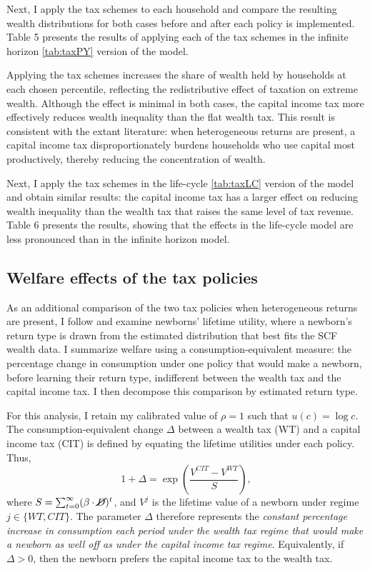 \par Next, I apply the tax schemes to each household and compare the resulting wealth distributions for both cases before and after each policy is implemented. Table 5 presents the results of applying each of the tax schemes in the infinite horizon \ref{tab:taxPY} version of the model. 
\unskip

\par Applying the tax schemes increases the share of wealth held by households at each chosen percentile, reflecting the redistributive effect of taxation on extreme wealth. Although the effect is minimal in both cases, the capital income tax more effectively reduces wealth inequality than the flat wealth tax. This result is consistent with the extant literature:  when heterogeneous returns are present, a capital income tax disproportionately burdens households who use capital most productively, thereby reducing the concentration of wealth. 

\par Next, I apply the tax schemes in the life-cycle \ref{tab:taxLC} version of the model and obtain similar results: the capital income tax has a larger effect on reducing wealth inequality than the wealth tax that raises the same level of tax revenue. Table 6 presents the results, showing that the effects in the life-cycle model are less pronounced than in the infinite horizon model. 

\unskip

\subsection{Welfare effects of the tax policies}

\par As an additional comparison of the two tax policies when heterogeneous returns are present, I follow \cite{Guvenen2023} and examine newborns' lifetime utility, where a newborn's return type is drawn from the estimated distribution that best fits the SCF wealth data. I summarize welfare using a consumption-equivalent measure: the percentage change in consumption under one policy that would make a newborn, before learning their return type, indifferent between the wealth tax and the capital income tax. I then decompose this comparison by estimated return type.

\par For this analysis, I retain my calibrated value of $\rho =1$ such that $u(c) = \log c$. The consumption-equivalent change $\Delta$ between a wealth tax (WT) and a capital income tax (CIT) is defined by equating the lifetime utilities under each policy. Thus,
$$
1 + \Delta = \exp\left( \frac{V^{CIT} - V^{WT}}{S} \right),
$$
where $S = \sum_{t=0}^{\infty} (\beta \cdot \cancel{D})^{t}$, and $V^{j}$ is the lifetime value of a newborn under regime $j \in \{WT, CIT\}$. The parameter $\Delta$ therefore represents the \textit{constant percentage increase in consumption each period under the wealth tax regime that would make a newborn as well off as under the capital income tax regime}. Equivalently, if $\Delta > 0$, then the newborn prefers the capital income tax to the wealth tax.
 
